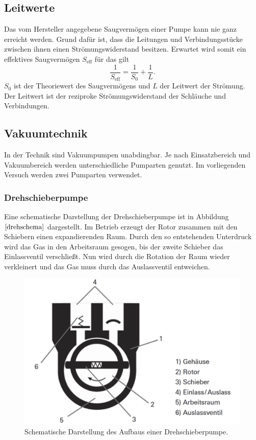 \subsection{Leitwerte}
Das vom Hersteller angegebene Saugvermögen einer Pumpe kann nie ganz erreicht werden.
Grund dafür ist, dass die Leitungen und Verbindungsstücke zwischen ihnen einen Strömungswiderstand besitzen.
Erwartet wird somit ein effektives Saugvermögen $S_\text{eff}$ für das gilt
\begin{equation}
  \frac{1}{S_\text{eff}}=\frac{1}{S_0}+\frac{1}{L}.
\end{equation}
$S_0$ ist der Theoriewert des Saugvermögens und $L$ der Leitwert der Strömung.\\
Der Leitwert ist der reziproke Strömungswiderstand der Schläuche und Verbindungen.
\subsection{Vakuumtechnik}
In der Technik sind Vakuumpumpen unabdingbar.
Je nach Einsatzbereich und Vakuumbereich werden unterschiedliche Pumparten genutzt.
Im vorliegenden Versuch werden zwei Pumparten verwendet.\\
\subsubsection{Drehschieberpumpe}
Eine schematische Darstellung der Drehschieberpumpe ist in Abbildung $\ref{drehschema}$ dargestellt. Im Betrieb erzeugt der Rotor zusammen mit den Schiebern einen expandierenden Raum. Durch den so entstehenden Unterdruck wird
das Gas in den Arbeitsraum gesogen, bis der zweite Schieber das Einlassventil verschließt. Nun wird durch die Rotation der Raum wieder verkleinert und das Gas muss durch das Auslassventil entweichen.
\begin{figure}[H]
  \centering
  \includegraphics[scale=0.4]{Bilder/drehschieber.png}
  \caption{Schematische Darstellung des Aufbaus einer Drehschieberpumpe.\cite{schemadreh}}
  \label{drehschema}
\end{figure}

